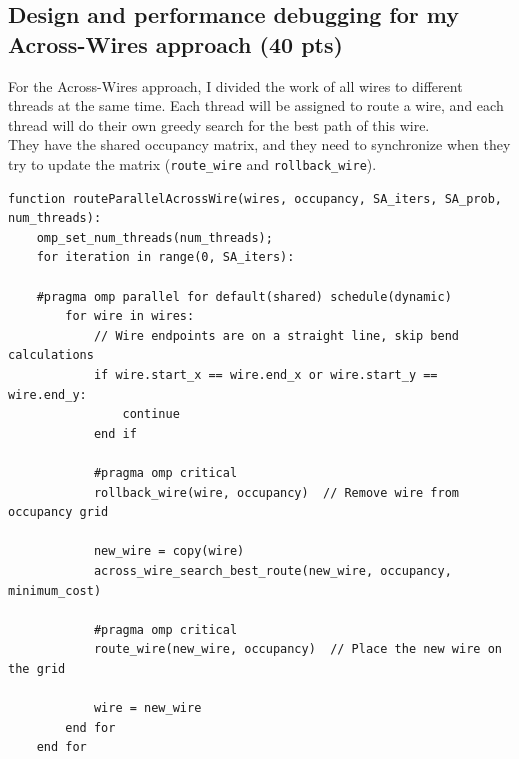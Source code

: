 \documentclass[letterpaper,11pt]{exam}
\begin{document}
\begin{questions}

    \question
    \subsection*{Design and performance debugging for my Across-Wires approach (40 pts)}
    For the Across-Wires approach, I divided the work of all wires to different threads at the same time.
    Each thread will be assigned to route a wire, and each thread will do their own greedy search for the best path of this wire. \\

    They have the shared occupancy matrix, and they need to synchronize when they try to update the matrix (\texttt{route\_wire} and \texttt{rollback\_wire}). \\


    \begin{lstlisting}[]
function routeParallelAcrossWire(wires, occupancy, SA_iters, SA_prob, num_threads):
    omp_set_num_threads(num_threads);    
    for iteration in range(0, SA_iters):
        
    #pragma omp parallel for default(shared) schedule(dynamic)
        for wire in wires:
            // Wire endpoints are on a straight line, skip bend calculations
            if wire.start_x == wire.end_x or wire.start_y == wire.end_y:
                continue
            end if

            #pragma omp critical
            rollback_wire(wire, occupancy)  // Remove wire from occupancy grid
            
            new_wire = copy(wire)
            across_wire_search_best_route(new_wire, occupancy, minimum_cost)

            #pragma omp critical
            route_wire(new_wire, occupancy)  // Place the new wire on the grid
            
            wire = new_wire
        end for
    end for
                        \end{lstlisting}


\end{questions}
\end{document}
